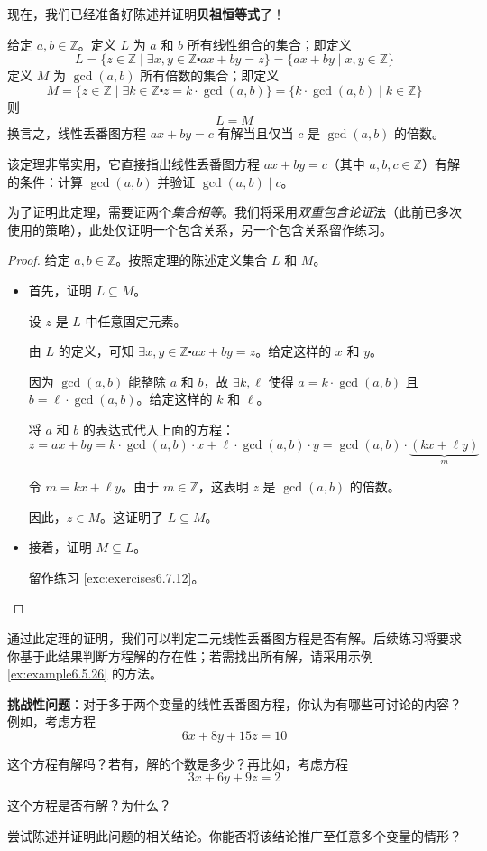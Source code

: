 现在，我们已经准备好陈述并证明\textbf{贝祖恒等式}了！

\begin{theorem}[贝祖恒等式]\label{theorem6.5.31}
   给定 $a, b \in \mathbb{Z}$。定义 $L$ 为 $a$ 和 $b$ 所有线性组合的集合；即定义
   \[L = \{z \in \mathbb{Z} \mid \exists x, y \in \mathbb{Z} \centerdot ax + by = z\} = \{ax + by \mid x, y \in \mathbb{Z}\}\]
   定义 $M$ 为 $\gcd(a, b)$ 所有倍数的集合；即定义
   \[M = \{z \in \mathbb{Z} \mid \exists k \in \mathbb{Z} \centerdot z = k \cdot \gcd(a, b)\} = \{k \cdot \gcd(a, b) \mid k \in \mathbb{Z}\}\]
   则
   \[L = M\]
   换言之，线性丢番图方程 $ax + by = c$ 有解当且仅当 $c$ 是 $\gcd(a, b)$ 的倍数。
\end{theorem}

该定理非常实用，它直接指出线性丢番图方程 $ax + by = c$（其中 $a, b, c \in \mathbb{Z}$）有解的条件：计算 $\gcd(a, b)$ 并验证 $\gcd(a, b) \mid c$。

为了证明此定理，需要证两个\emph{集合相等}。我们将采用\emph{双重包含论证}法（此前已多次使用的策略），此处仅证明一个包含关系，另一个包含关系留作练习。

\begin{proof}
    给定 $a, b \in \mathbb{Z}$。按照定理的陈述定义集合 $L$ 和 $M$。
    \begin{itemize}
        \item 首先，证明 $L \subseteq M$。
        
            设 $z$ 是 $L$ 中任意固定元素。

            由 $L$ 的定义，可知 $\exists x, y \in \mathbb{Z} \centerdot ax + by = z$。给定这样的 $x$ 和 $y$。

            因为 $\gcd(a, b)$ 能整除 $a$ 和 $b$，故 $\exists k, \ell$ 使得 $a = k \cdot \gcd(a, b)$ 且 $b = \ell  \cdot \gcd(a, b)$。给定这样的 $k$ 和 $\ell$。

            将 $a$ 和 $b$ 的表达式代入上面的方程：
            \[z = ax + by = k \cdot \gcd(a, b) \cdot x + \ell \cdot \gcd(a, b) \cdot y = \gcd(a, b) \cdot \underbrace{(kx + \ell y)}_{m}\]

            令 $m = kx + \ell y$。由于 $m \in \mathbb{Z}$，这表明 $z$ 是 $\gcd(a, b)$ 的倍数。

            因此，$z \in M$。这证明了 $L \subseteq M$。\\
        \item 接着，证明 $M \subseteq L$。

            留作练习 \ref{exc:exercises6.7.12}。
    \end{itemize}
\end{proof}

通过此定理的证明，我们可以判定二元线性丢番图方程是否有解。后续练习将要求你基于此结果判断方程解的存在性；若需找出所有解，请采用示例 \ref{ex:example6.5.26} 的方法。

\textbf{挑战性问题}：对于多于两个变量的线性丢番图方程，你认为有哪些可讨论的内容？例如，考虑方程
\[6x + 8y + 15z = 10\]

这个方程有解吗？若有，解的个数是多少？再比如，考虑方程
\[3x + 6y + 9z = 2\]

这个方程是否有解？为什么？

尝试陈述并证明此问题的相关结论。你能否将该结论推广至任意多个变量的情形？
